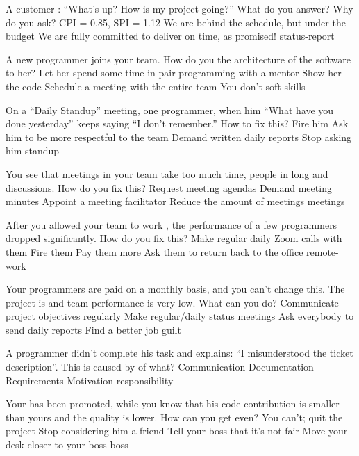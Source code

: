\documentclass{article}
\begin{document}

\pmbaQuestion
  {A customer : ``What's up? How is my project going?''
    What do you answer?}
  {Why do you ask?}
  {CPI = 0.85, SPI = 1.12}
  {We are behind the schedule, but under the budget}
  {We are fully committed to deliver on time, as promised!}
  {status-report}

\pmbaQuestion
  {A new programmer joins your team.
    How do you  the architecture of the software to her?}
  {Let her spend some time in pair programming with a mentor}
  {Show her the code}
  {Schedule a meeting with the entire team}
  {You don't}
  {soft-skills}

\pmbaQuestion
  {On a ``Daily Standup'' meeting, one programmer, when  him
    ``What have you done yesterday'' keeps saying ``I don't remember.''
    How to fix this?}
  {Fire him}
  {Ask him to be more respectful to the team}
  {Demand written daily reports}
  {Stop asking him}
  {standup}

\pmbaQuestion
  {You see that meetings in your team take too much time,
    people  in long and  discussions.
    How do you fix this?}
  {Request meeting agendas}
  {Demand meeting minutes}
  {Appoint a meeting facilitator}
  {Reduce the amount of meetings}
  {meetings}

\pmbaQuestion
  {After you allowed your team to work ,
    the performance of a few programmers dropped significantly.
    How do you fix this?}
  {Make regular daily Zoom calls with them}
  {Fire them}
  {Pay them more}
  {Ask them to return back to the office}
  {remote-work}

\pmbaQuestion
  {Your programmers are paid on a monthly basis, and you can't change this.
    The project is  and team performance is very low.
    What can you do?}
  {Communicate project objectives regularly}
  {Make regular/daily status meetings}
  {Ask everybody to send daily reports}
  {Find a better job}
  {guilt}

\pmbaQuestion
  {A programmer didn't complete his task and explains:
    ``I misunderstood the ticket description''.
    This is caused by  of what?}
  {Communication}
  {Documentation}
  {Requirements}
  {Motivation}
  {responsibility}

\pmbaQuestion
  {Your  has been promoted, while you know that his
    code contribution is smaller than yours and the quality is lower.
    How can you get even?}
  {You can't; quit the project}
  {Stop considering him a friend}
  {Tell your boss that it's not fair}
  {Move your desk closer to your boss}
  {boss}
\end{document}
